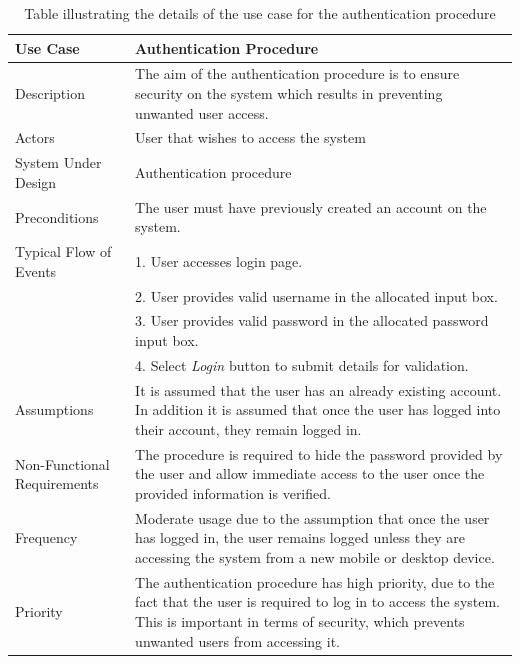 \documentclass[10pt,twocolumn]{witseiepaper}
\begin{document}
	\begin{table}[H]
		\centering
		\caption{Table illustrating the details of the use case for the authentication procedure}
		\label{authentication_use_case}
		\begin{tabular}{| p{22mm} | p{50mm} |}
			\hline
			\textbf{Use Case} & \textbf{Authentication Procedure} \\
			\hline
			Description & The aim of the authentication procedure is to ensure security on the system which results in preventing unwanted user access. \\
			\hline
			Actors & User that wishes to access the system \\
			\hline
			System Under Design & Authentication procedure\\
			\hline
			Preconditions & The user must have previously created an account on the system. \\
			\hline
			Typical Flow of Events & 1. User accesses login page. \\
			& 2. User provides valid username in the allocated input box.\\
			& 3. User provides valid password in the allocated password input box. \\
			& 4. Select \textit{Login} button to submit details for validation.\\
			\hline
			Assumptions & It is assumed that the user has an already existing account. In addition it is assumed that once the user has logged into their account, they remain logged in.\\
			\hline
			Non-Functional Requirements & The procedure is required to hide the password provided by the user and allow immediate access to the user once the provided information is verified.\\
			\hline
			Frequency & Moderate usage due to the assumption that once the user has logged in, the user remains logged unless they are accessing the system from a new mobile or desktop device.\\
			\hline
			Priority & The authentication procedure has high priority, due to the fact that the user is required to log in to access the system. This is important in terms of security, which prevents unwanted users from accessing it.\\
			\hline
		\end{tabular}
	\end{table}
\end{document}
